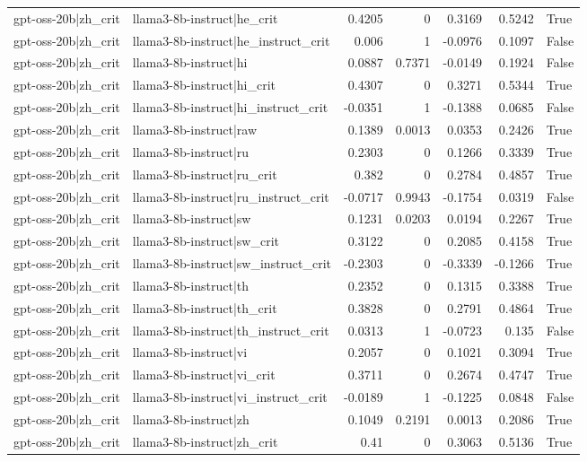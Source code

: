 \begin{table}
\begin{tabular}{l l r r r r l}
gpt-oss-20b|zh_crit & llama3-8b-instruct|he_crit & 0.4205 & 0 & 0.3169 & 0.5242 & True \\
gpt-oss-20b|zh_crit & llama3-8b-instruct|he_instruct_crit & 0.006 & 1 & -0.0976 & 0.1097 & False \\
gpt-oss-20b|zh_crit & llama3-8b-instruct|hi & 0.0887 & 0.7371 & -0.0149 & 0.1924 & False \\
gpt-oss-20b|zh_crit & llama3-8b-instruct|hi_crit & 0.4307 & 0 & 0.3271 & 0.5344 & True \\
gpt-oss-20b|zh_crit & llama3-8b-instruct|hi_instruct_crit & -0.0351 & 1 & -0.1388 & 0.0685 & False \\
gpt-oss-20b|zh_crit & llama3-8b-instruct|raw & 0.1389 & 0.0013 & 0.0353 & 0.2426 & True \\
gpt-oss-20b|zh_crit & llama3-8b-instruct|ru & 0.2303 & 0 & 0.1266 & 0.3339 & True \\
gpt-oss-20b|zh_crit & llama3-8b-instruct|ru_crit & 0.382 & 0 & 0.2784 & 0.4857 & True \\
gpt-oss-20b|zh_crit & llama3-8b-instruct|ru_instruct_crit & -0.0717 & 0.9943 & -0.1754 & 0.0319 & False \\
gpt-oss-20b|zh_crit & llama3-8b-instruct|sw & 0.1231 & 0.0203 & 0.0194 & 0.2267 & True \\
gpt-oss-20b|zh_crit & llama3-8b-instruct|sw_crit & 0.3122 & 0 & 0.2085 & 0.4158 & True \\
gpt-oss-20b|zh_crit & llama3-8b-instruct|sw_instruct_crit & -0.2303 & 0 & -0.3339 & -0.1266 & True \\
gpt-oss-20b|zh_crit & llama3-8b-instruct|th & 0.2352 & 0 & 0.1315 & 0.3388 & True \\
gpt-oss-20b|zh_crit & llama3-8b-instruct|th_crit & 0.3828 & 0 & 0.2791 & 0.4864 & True \\
gpt-oss-20b|zh_crit & llama3-8b-instruct|th_instruct_crit & 0.0313 & 1 & -0.0723 & 0.135 & False \\
gpt-oss-20b|zh_crit & llama3-8b-instruct|vi & 0.2057 & 0 & 0.1021 & 0.3094 & True \\
gpt-oss-20b|zh_crit & llama3-8b-instruct|vi_crit & 0.3711 & 0 & 0.2674 & 0.4747 & True \\
gpt-oss-20b|zh_crit & llama3-8b-instruct|vi_instruct_crit & -0.0189 & 1 & -0.1225 & 0.0848 & False \\
gpt-oss-20b|zh_crit & llama3-8b-instruct|zh & 0.1049 & 0.2191 & 0.0013 & 0.2086 & True \\
gpt-oss-20b|zh_crit & llama3-8b-instruct|zh_crit & 0.41 & 0 & 0.3063 & 0.5136 & True \\

\end{tabular}
\end{table}
